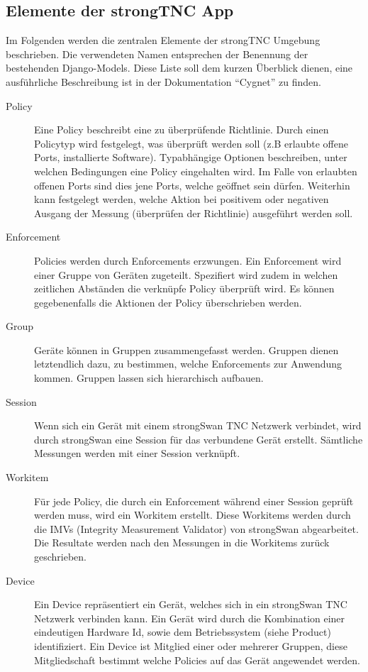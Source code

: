 \subsection{Elemente der strongTNC App} Im Folgenden werden die zentralen
Elemente der strongTNC Umgebung beschrieben. Die verwendeten Namen entsprechen
der Benennung der bestehenden Django-Models. Diese Liste soll dem kurzen Überblick dienen,
eine ausführliche Beschreibung ist in der Dokumentation
\enquote{Cygnet}\cite{cygnet:2013} zu finden.
\begin{description}
	\item[Policy] Eine Policy beschreibt eine zu überprüfende Richtlinie. Durch einen Policytyp wird
	festgelegt, was überprüft werden soll (z.B erlaubte offene Ports, installierte Software).
	Typabhängige Optionen beschreiben, unter welchen Bedingungen eine Policy eingehalten wird.
	Im Falle von erlaubten offenen Ports sind dies jene Ports, welche geöffnet sein dürfen.
	Weiterhin kann festgelegt werden, welche Aktion bei positivem oder negativen Ausgang der
	Messung (überprüfen der Richtlinie) ausgeführt werden soll.
	
	\item[Enforcement] Policies werden durch Enforcements erzwungen. 
	Ein Enforcement wird einer Gruppe von Geräten zugeteilt. Spezifiert wird zudem in welchen zeitlichen
	Abständen die verknüpfe Policy überprüft wird. Es können gegebenenfalls
	die Aktionen der Policy überschrieben werden.
	
	\item[Group] Geräte können in Gruppen zusammengefasst werden. Gruppen
	dienen letztendlich dazu, zu bestimmen, welche Enforcements zur Anwendung
	kommen. Gruppen lassen sich hierarchisch aufbauen.
		
	\item[Session] Wenn sich ein Gerät mit einem strongSwan TNC Netzwerk verbindet,
	wird durch strongSwan eine Session für das verbundene Gerät erstellt. Sämtliche
	Messungen werden mit einer Session verknüpft.
	
	\item[Workitem] Für jede Policy, die durch ein Enforcement während einer Session
	geprüft werden muss, wird ein Workitem erstellt. Diese Workitems werden durch
	die IMVs (Integrity Measurement Validator) von strongSwan abgearbeitet. Die
	Resultate werden nach den Messungen in die Workitems zurück geschrieben.
	
	\item[Device] Ein Device repräsentiert ein Gerät, welches sich in ein
	strongSwan TNC Netzwerk verbinden kann. Ein Gerät wird durch die Kombination
	einer eindeutigen Hardware Id, sowie dem Betriebssystem (siehe Product)
	identifiziert. Ein Device ist Mitglied einer oder mehrerer Gruppen, diese
	Mitgliedschaft bestimmt welche Policies auf das Gerät angewendet werden.
	

\end{description}
